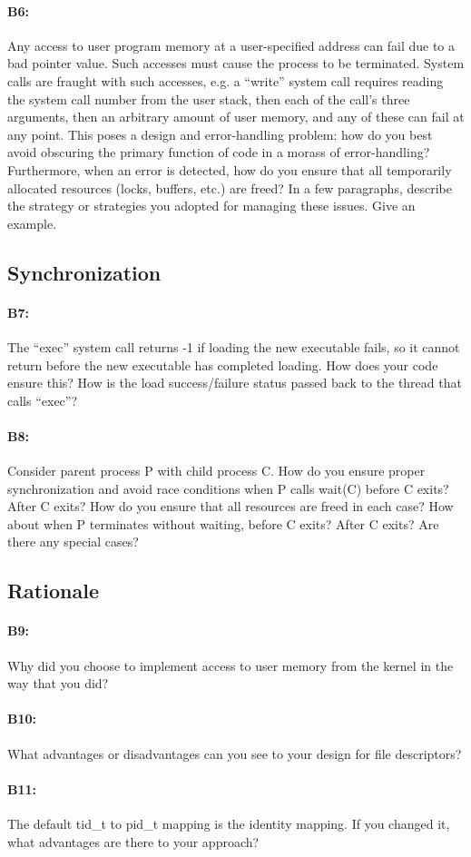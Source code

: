 \paragraph{B6:} %
Any access to user program memory at a user-specified address can fail due to a bad pointer value.  Such accesses must cause the process to be terminated.  System calls are fraught with such accesses, e.g. a ``write'' system call requires reading the system call number from the user stack, then each of the call's three arguments, then an arbitrary amount of user memory, and any of these can fail at any point.  This poses a design and error-handling problem: how do you best avoid obscuring the primary function of code in a morass of error-handling?  Furthermore, when an error is detected, how do you ensure that all temporarily allocated resources (locks, buffers, etc.) are freed?  In a few paragraphs, describe the strategy or strategies you adopted for managing these issues.  Give an example.

\subsection{Synchronization}

\paragraph{B7:} %
The ``exec'' system call returns -1 if loading the new executable fails, so it cannot return before the new executable has completed loading.  How does your code ensure this?  How is the load success/failure status passed back to the thread that calls ``exec''?

\paragraph{B8:} %
Consider parent process P with child process C.  How do you ensure proper synchronization and avoid race conditions when P calls wait(C) before C exits?  After C exits?  How do you ensure that all resources are freed in each case?  How about when P terminates without waiting, before C exits?  After C exits?  Are there any special cases?

\subsection{Rationale}

\paragraph{B9:} %
Why did you choose to implement access to user memory from the kernel in the way that you did?

\paragraph{B10:} %
What advantages or disadvantages can you see to your design for file descriptors?

\paragraph{B11:} %
The default tid\_t to pid\_t mapping is the identity mapping. If you changed it, what advantages are there to your approach?